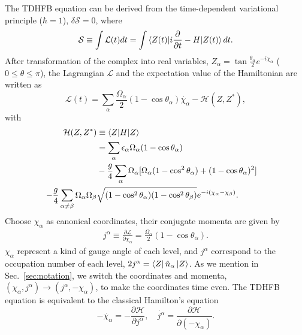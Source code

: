 \documentclass[%
superscriptaddress,
showpacs,
nofootinbib,
amsmath,amssymb,
aps,
prc,
twocolumn,
floatfix ]%
{revtex4-1}
\begin{document}
The TDHFB equation can be derived from the time-dependent variational
principle ($\hbar=1$), $\delta \mathcal{S} = 0$, where
\begin{equation}
	\mathcal{S}\equiv \int \mathcal{L}(t) dt =
	\int \braket{Z(t)|i\frac{\partial}{\partial t}-H|Z(t)}dt.
  \label{TDHFB}
\end{equation}
After transformation of the complex into real variables,
$Z_\alpha = \tan{\frac{\theta_\alpha}{2}}e^{-i\chi_\alpha}$
($0\leq\theta\leq\pi$),
the Lagrangian $\mathcal{L}$ and the expectation value of the Hamiltonian
are written as
\begin{equation}
\mathcal{L}(t) = \sum_\alpha \frac{\Omega_\alpha}{2}
	(1-\cos{\theta}_\alpha)\dot{\chi_\alpha} - \mathcal{H}(Z,Z^*) ,
\end{equation}
with
\begin{align}
	\mathcal{H}(Z,Z^*) &\equiv \braket{Z|H|Z}& \nonumber \\
	&= \sum_\alpha \epsilon_\alpha\Omega_\alpha(1- \cos{\theta}_\alpha)
	\nonumber \\
	&- \frac{g}{4}\sum_\alpha \Omega_\alpha [\Omega_\alpha(1-\cos^2{\theta}_\alpha)+(1-\cos{\theta}_\alpha)^2] \nonumber \\
	- \frac{g}{4}\sum_{\alpha\neq \beta} \Omega_{\alpha}\Omega_{\beta}&\sqrt{(1-\cos^2{\theta}_{\alpha})(1-\cos^2{\theta}_{\beta})}e^{-i(\chi_{\alpha}-\chi_{\beta})}   .
\label{TDHFB_Hamiltonian_2}
\end{align}
Choose $\chi_\alpha$ as canonical coordinates, their conjugate momenta
are given by
\begin{align}
  j^\alpha\equiv
	\frac{\partial\mathcal{L}}{\partial\dot{\chi}_\alpha}=\frac{\Omega_\alpha}{2}
	(1-\cos{\theta}_\alpha) .
\end{align}
$\chi_\alpha$ represent a kind of gauge angle of each level,
and $j^\alpha$ correspond to the occupation number of each level,
$2j^\alpha=\bra{Z} \hat{n}_\alpha\ket{Z}$. 
As we mention in Sec.~\ref{sec:notation},
we switch the coordinates and momenta,
$(\chi_\alpha,j^\alpha) \rightarrow (j^\alpha,-\chi_\alpha)$,
to make the coordinates time even.
The TDHFB equation is equivalent to the classical Hamilton's equation
\begin{equation}
	-\dot{\chi_\alpha} = -\frac{\partial\mathcal{H}}{\partial j^\alpha}, \quad
	\dot{j^\alpha} = \frac{\partial\mathcal{H}}{\partial (-\chi_\alpha)} .
\end{equation}
\end{document}
